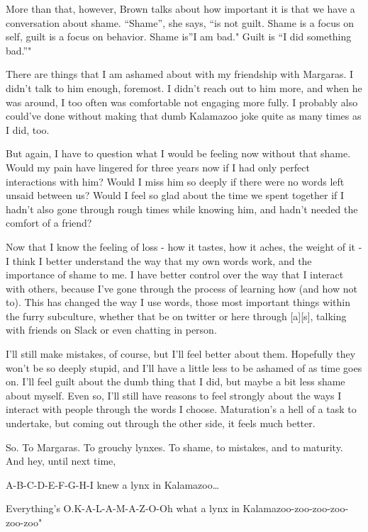 More than that, however, Brown talks about how important it is that we have a conversation about shame. ``Shame'', she says, ``is not guilt. Shame is a focus on self, guilt is a focus on behavior. Shame is''I am bad." Guilt is ``I did something bad.''"

There are things that I am ashamed about with my friendship with Margaras. I didn't talk to him enough, foremost. I didn't reach out to him more, and when he was around, I too often was comfortable not engaging more fully. I probably also could've done without making that dumb Kalamazoo joke quite as many times as I did, too.

But again, I have to question what I would be feeling now without that shame. Would my pain have lingered for three years now if I had only perfect interactions with him? Would I miss him so deeply if there were no words left unsaid between us? Would I feel so glad about the time we spent together if I hadn't also gone through rough times while knowing him, and hadn't needed the comfort of a friend?

Now that I know the feeling of loss - how it tastes, how it aches, the weight of it - I think I better understand the way that my own words work, and the importance of shame to me. I have better control over the way that I interact with others, because I've gone through the process of learning how (and how not to). This has changed the way I use words, those most important things within the furry subculture, whether that be on twitter or here through {[}a{]}{[}s{]}, talking with friends on Slack or even chatting in person.

I'll still make mistakes, of course, but I'll feel better about them. Hopefully they won't be so deeply stupid, and I'll have a little less to be ashamed of as time goes on. I'll feel guilt about the dumb thing that I did, but maybe a bit less shame about myself. Even so, I'll still have reasons to feel strongly about the ways I interact with people through the words I choose. Maturation's a hell of a task to undertake, but coming out through the other side, it feels much better.

So. To Margaras. To grouchy lynxes. To shame, to mistakes, and to maturity. And hey, until next time,

A-B-C-D-E-F-G-H-I knew a lynx in Kalamazoo\ldots{}

Everything's O.K-A-L-A-M-A-Z-O-Oh what a lynx in Kalamazoo-zoo-zoo-zoo-zoo-zoo"
